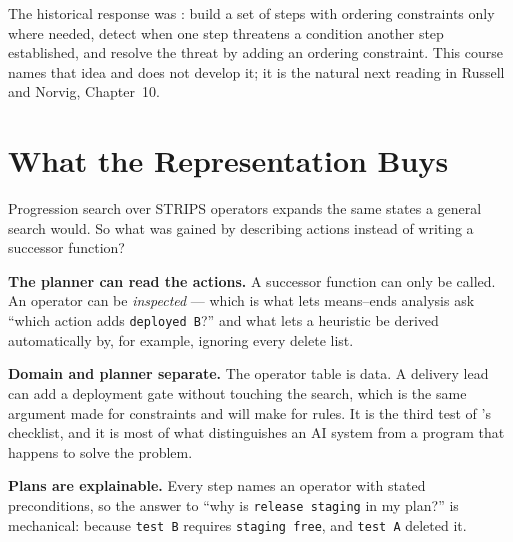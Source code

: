The historical response was : build a set of steps with
ordering constraints only where needed, detect when one step threatens a condition
another step established, and resolve the threat by adding an ordering constraint.
This course names that idea and does not develop it; it is the natural next reading
in Russell and Norvig, Chapter~10.

\section{What the Representation Buys}

Progression search over STRIPS operators expands the same states a general search
would. So what was gained by describing actions instead of writing a successor
function?

\textbf{The planner can read the actions.} A successor function can only be called.
An operator can be \emph{inspected} --- which is what lets means--ends analysis ask
``which action adds \texttt{deployed B}?'' and what lets a heuristic be derived
automatically by, for example, ignoring every delete list.

\textbf{Domain and planner separate.} The operator table is data. A delivery lead
can add a deployment gate without touching the search, which is the same argument
 made for constraints and  will make for rules. It is the
third test of 's checklist, and it is most of what
distinguishes an AI system from a program that happens to solve the problem.

\textbf{Plans are explainable.} Every step names an operator with stated
preconditions, so the answer to ``why is \texttt{release staging} in my plan?'' is
mechanical: because \texttt{test B} requires \texttt{staging free}, and
\texttt{test A} deleted it.


